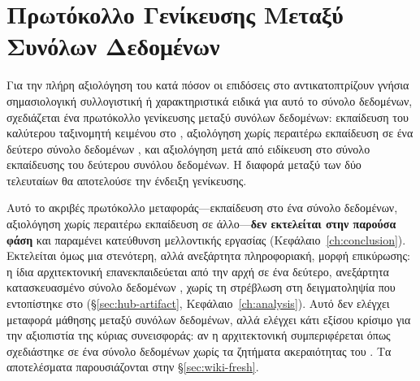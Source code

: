 \section{Πρωτόκολλο Γενίκευσης Μεταξύ Συνόλων Δεδομένων}
\label{sec:generalization-protocol}

Για την πλήρη αξιολόγηση του κατά πόσον οι επιδόσεις στο 
αντικατοπτρίζουν γνήσια σημασιολογική συλλογιστική ή χαρακτηριστικά ειδικά για
αυτό το σύνολο δεδομένων, σχεδιάζεται ένα πρωτόκολλο γενίκευσης μεταξύ συνόλων
δεδομένων: εκπαίδευση του καλύτερου ταξινομητή κειμένου στο ,
αξιολόγηση χωρίς περαιτέρω εκπαίδευση σε ένα δεύτερο σύνολο δεδομένων , και
αξιολόγηση μετά από ειδίκευση στο σύνολο εκπαίδευσης του δεύτερου συνόλου
δεδομένων.
Η διαφορά μεταξύ των δύο τελευταίων θα αποτελούσε την ένδειξη
γενίκευσης.

Αυτό το ακριβές πρωτόκολλο μεταφοράς---εκπαίδευση στο ένα σύνολο δεδομένων,
αξιολόγηση χωρίς περαιτέρω εκπαίδευση σε άλλο---\textbf{δεν εκτελείται στην
παρούσα φάση} και παραμένει κατεύθυνση μελλοντικής εργασίας
(Κεφάλαιο~\ref{ch:conclusion}).
Εκτελείται όμως μια στενότερη, αλλά ανεξάρτητα
πληροφοριακή, μορφή επικύρωσης: η ίδια αρχιτεκτονική 
επανεκπαιδεύεται από την αρχή σε ένα δεύτερο, ανεξάρτητα κατασκευασμένο σύνολο
δεδομένων , χωρίς τη στρέβλωση στη δειγματοληψία που εντοπίστηκε
στο  (\S\ref{sec:hub-artifact}, Κεφάλαιο~\ref{ch:analysis}).
Αυτό δεν ελέγχει μεταφορά μάθησης μεταξύ συνόλων δεδομένων, αλλά ελέγχει κάτι
εξίσου κρίσιμο για την αξιοπιστία της κύριας συνεισφοράς: αν η αρχιτεκτονική
συμπεριφέρεται όπως σχεδιάστηκε σε ένα σύνολο δεδομένων χωρίς τα ζητήματα
ακεραιότητας του .
Τα αποτελέσματα παρουσιάζονται στην
\S\ref{sec:wiki-fresh}.
